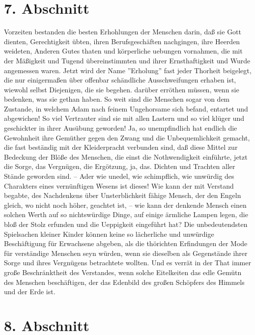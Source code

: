 \section{7. Abschnitt}

Vorzeiten bestanden die besten Erhohlungen der Menschen darin, daß sie Gott
dienten, Gerechtigkeit übten, ihren Berufsgeschäften nachgingen, ihre Heerden
weideten, Anderen Gutes thaten und körperliche uebungen vornahmen, die mit der
Mäßigkeit und Tugend übereinstimmten und ihrer Ernsthaftigkeit und Wurde
angemessen waren. Jetzt wird der Name ''Erholung'' fast jeder Thorheit
beigelegt, die nur einigermaßen über offenbar schändliche Ausschweifungen
erhaben ist, wiewohl selbst Diejenigen, die sie begehen. darüber erröthen
müssen, wenn sie bedenken, was sie gethan haben. So weit sind die Menschen sogar
von dem Zustande, in welchem Adam nach feinem Ungehorsame sich befand, entartet
und abgewichen! So viel Vertrauter sind sie mit allen Lastern und so viel klüger
und geschickter in ihrer Ausübung geworden! Ja, so unempfindlich hat endlich die
Gewohnheit ihre Gemüther gegen den Zwang und die Unbequemlichkeit gemacht, die
fast beständig mit der Kleiderpracht verbunden sind, daß diese Mittel zur
Bedeckung der Blöße des Menschen, die einst die Nothwendigkeit einführte, jetzt
die Sorge, das Vergnügen, die Ergötzung, ja, das. Dichten und Trachten aller
Stände geworden sind. -- Ader wie unedel, wie schimpflich, wie unwürdig des
Charakters eines vernünftigen Wesens ist dieses! Wie kann der mit Verstand
begabte, des Nachdenkens über Unsterblichkeit fähige Mensch, der den Engeln
gleich, wo nicht noch höher, geachtet ist, -- wie kann der denkende Mensch einen
solchen Werth auf so nichtswürdige Dinge, auf einige ärmliche Lampen legen, die
bloß der Stolz erfunden und die Ueppigkeit eingeführt hat? Die unbedeutendsten
Spielsachen kleiner Kinder können keine so lächerliche und unwürdige
Beschäftigung für Erwachsene abgeben, als die thörichten Erfindungen der Mode
für verständige Menschen seyn würden, wenn sie dieselben als Gegenstände ihrer
Sorge und ihres Vergnügens betrachtete wollten. Und es verrät in der That immer
große Beschränktheit des Verstandes, wenn solche Eitelkeiten das edle Gemütn des
Menschen beschäftigen, der das Edenbild des großen Schöpfers des Himmels und der
Erde ist.

\section{8. Abschnitt}

